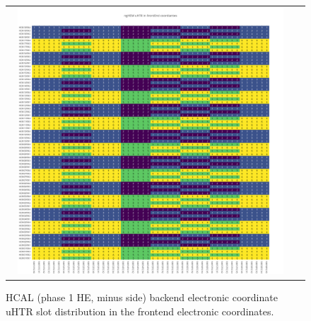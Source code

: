 \clearpage
\begin{figure}[htb]
 \begin{center}
  \begin{tabular}{cc}
   \includegraphics[angle=0,width=0.95\textwidth]{figures/appendix/ngHEM_uHTR_in_FrontEnd.png}
  \end{tabular}
  \caption{HCAL (phase 1 HE, minus side) backend electronic coordinate uHTR slot distribution in the frontend electronic coordinates.}
  \label{fig:lmapngHEMuHTRFEC}
 \end{center}
\end{figure}


